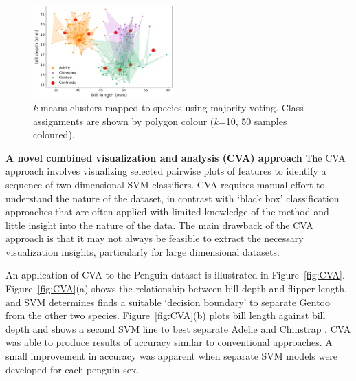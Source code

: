 \documentclass[a4paper, 11pt]{article}
\begin{document}
\begin{figure} %
  \centering
  \vspace{-1\baselineskip} %
  \includegraphics[width=0.48\textwidth]{kmeansmap.png} %
  \vspace{-0.5\baselineskip} %
  \caption{\centering\linespread{0.8}\selectfont \textit{k}-means clusters mapped to species using majority voting. 
  Class assignments are shown by polygon colour (\textit{k}=10, 50 samples coloured).}
  \vspace{-1\baselineskip} %
  \label{fig:kmeansmap}
\end{figure}

\textbf{A novel combined visualization and analysis (CVA) approach}  
The CVA approach involves visualizing selected pairwise plots of features 
to identify a sequence of two-dimensional SVM classifiers. 
CVA requires manual effort to understand the nature of the dataset, 
in contrast with `black box' classification approaches that are often applied with limited knowledge 
of the method and little insight into the nature of the data. 
The main drawback of the CVA approach is that it may not always be feasible to extract the necessary visualization insights, 
particularly for large dimensional datasets. 

An application of CVA to the Penguin dataset is illustrated in Figure~\ref{fig:CVA}. 
Figure~\ref{fig:CVA}(a) shows the relationship between bill depth and flipper length, and
SVM determines finds a suitable `decision boundary' to separate Gentoo from the other two species. 
Figure~\ref{fig:CVA}(b) plots bill length against bill depth and shows a second SVM line to best separate Adelie and Chinstrap . 
CVA was able to produce results of accuracy similar to conventional approaches. A small improvement in accuracy
was apparent when separate SVM models were developed for each penguin sex.
\end{document}
